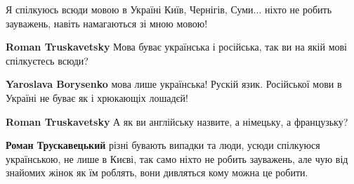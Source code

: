 \begin{itemize}
 

Я спілкуюсь всюди мовою в Україні Київ, Чернігів, Суми... ніхто не робить
зауважень, навіть намагаються зі мною мовою!

\begin{itemize}
 
\textbf{Roman Truskavetsky} Мова буває українська і російська, так ви на якій мові спілкуєтесь всюди?

 
\textbf{Yaroslava Borysenko} мова лише українська! Рускій язик. Російської мови в Україні не буває як і хрюкающіх лошадєй!

 
\textbf{Roman Truskavetsky} А як ви англійську назвите, а німецьку, а французьку?

 
\textbf{Роман Трускавецький} різні бувають випадки та люди, усюди спілкуюся українською, не лише в Києві, так само ніхто не робить зауважень, але чую від знайомих жінок як їм роблять, вони дивляться кому можна це робити.

 

\end{itemize}
\end{itemize}
